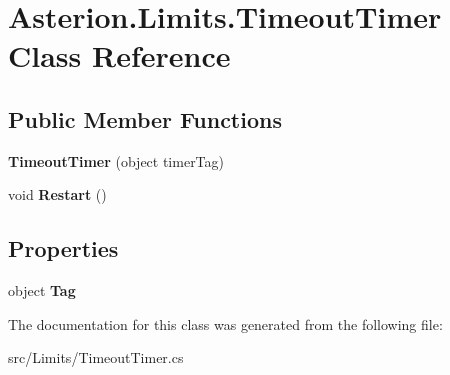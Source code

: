 \hypertarget{classAsterion_1_1Limits_1_1TimeoutTimer}{\section{Asterion.\-Limits.\-Timeout\-Timer Class Reference}
\label{classAsterion_1_1Limits_1_1TimeoutTimer}
}
\subsection*{Public Member Functions}
\begin{DoxyCompactItemize}
\item 
\hypertarget{classAsterion_1_1Limits_1_1TimeoutTimer_acbecd984c9075bcbbea897c5974b91d7}{{\bfseries Timeout\-Timer} (object timer\-Tag)}\label{classAsterion_1_1Limits_1_1TimeoutTimer_acbecd984c9075bcbbea897c5974b91d7}

\item 
\hypertarget{classAsterion_1_1Limits_1_1TimeoutTimer_a08b319ffd75c172f4575325d833425c3}{void {\bfseries Restart} ()}\label{classAsterion_1_1Limits_1_1TimeoutTimer_a08b319ffd75c172f4575325d833425c3}

\end{DoxyCompactItemize}
\subsection*{Properties}
\begin{DoxyCompactItemize}
\item 
\hypertarget{classAsterion_1_1Limits_1_1TimeoutTimer_a9434eddc1291650403b3c75dc09fc0d8}{object {\bfseries Tag}}\label{classAsterion_1_1Limits_1_1TimeoutTimer_a9434eddc1291650403b3c75dc09fc0d8}

\end{DoxyCompactItemize}


The documentation for this class was generated from the following file\-:\begin{DoxyCompactItemize}
\item 
src/\-Limits/Timeout\-Timer.\-cs\end{DoxyCompactItemize}
